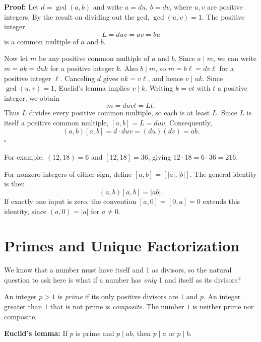 \documentclass[a4paper,11pt,abstracton]{scrartcl}
\theoremstyle{dotlessP}
\theoremstyle{dotlessS}
\theoremstyle{remark}
\theoremstyle{definition}
\begin{document}
\textbf{Proof:}
Let $d=\gcd(a,b)$ and write $a=du$, $b=dv$, where $u,v$ are positive
integers. By the result on dividing out the gcd, $\gcd(u,v)=1$.
The positive integer
\[
    L=duv=av=bu
\]
is a common multiple of $a$ and $b$.

Now let $m$ be any positive common multiple of $a$ and $b$.
Since $a\mid m$, we can write $m=ak=duk$ for a positive integer $k$.
Also $b\mid m$, so $m=b\ell=dv\ell$ for a positive integer $\ell$.
Canceling $d$ gives $uk=v\ell$, and hence $v\mid uk$.
Since $\gcd(u,v)=1$, Euclid's lemma implies $v\mid k$.
Writing $k=vt$ with $t$ a positive integer, we obtain
\[
    m=duvt=Lt.
\]
Thus $L$ divides every positive common multiple, so each is at least
$L$. Since $L$ is itself a positive common multiple, $[a,b]=L=duv$.
Consequently,
\[
    (a,b)[a,b]=d\cdot duv=(du)(dv)=ab.
\]
\hfill$\square$



\begin{example_box}
For example, $(12,18)=6$ and $[12,18]=36$, giving
$12\cdot18=6\cdot36=216$.
\end{example_box}



\begin{definition_box}
For nonzero integers of either sign, define
$[a,b]=[|a|,|b|]$. The general identity is then
\[
    (a,b)[a,b]=|ab|.
\]
If exactly one input is zero, the convention $[a,0]=[0,a]=0$ extends
this identity, since $(a,0)=|a|$ for $a\neq0$.
\end{definition_box}

\section{Primes and Unique Factorization}

We know that a number must have itself and 1 as divisors, so the natural question to ask here is what if a number has \emph{only} 1 and itself as its divisors?

\begin{definition_box}
An integer $p>1$ is \emph{prime} if its only positive divisors are $1$
and $p$. An integer greater than $1$ that is not prime is
\emph{composite}. The number $1$ is neither prime nor composite.
\end{definition_box}


\begin{remark_box}
\textbf{Euclid's lemma:}
If $p$ is prime and $p\mid ab$, then $p\mid a$ or $p\mid b$.
\end{remark_box}
\end{document}
